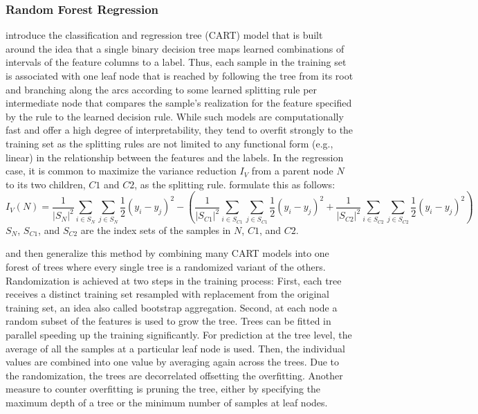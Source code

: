 \subsubsection{Random Forest Regression}
\label{rf}

\cite{breiman1984} introduce the classification and regression tree
    (CART) model that is built around the idea that a single binary
    decision tree maps learned combinations of intervals of the feature
    columns to a label.
Thus, each sample in the training set is associated with one leaf node that
    is reached by following the tree from its root and branching along the
    arcs according to some learned splitting rule per intermediate node that
    compares the sample's realization for the feature specified by the rule to
    the learned decision rule.
While such models are computationally fast and offer a high degree of
    interpretability, they tend to overfit strongly to the training set as
    the splitting rules are not limited to any functional form (e.g., linear)
    in the relationship between the features and the labels.
In the regression case, it is common to maximize the variance reduction $I_V$
    from a parent node $N$ to its two children, $C1$ and $C2$, as the
    splitting rule.
\cite{breiman1984} formulate this as follows:
$$
I_V(N)
=
\frac{1}{|S_N|^2} \sum_{i \in S_N} \sum_{j \in S_N}
    \frac{1}{2} (y_i - y_j)^2
- \left(
    \frac{1}{|S_{C1}|^2} \sum_{i \in S_{C1}} \sum_{j \in S_{C1}}
        \frac{1}{2} (y_i - y_j)^2
    +
    \frac{1}{|S_{C2}|^2} \sum_{i \in S_{C2}} \sum_{j \in S_{C2}}
        \frac{1}{2} (y_i - y_j)^2
\right)
$$
$S_N$, $S_{C1}$, and $S_{C2}$ are the index sets of the samples in $N$, $C1$,
    and $C2$. 

\cite{ho1998} and then \cite{breiman2001} generalize this method by combining
    many CART models into one forest of trees where every single tree is
    a randomized variant of the others.
Randomization is achieved at two steps in the training process:
First, each tree receives a distinct training set resampled with replacement
    from the original training set, an idea also called bootstrap
    aggregation.
Second, at each node a random subset of the features is used to grow the tree.
Trees can be fitted in parallel speeding up the training significantly.
For prediction at the tree level, the average of all the samples at a
    particular leaf node is used.
Then, the individual values are combined into one value by averaging again
    across the trees.
Due to the randomization, the trees are decorrelated offsetting the
    overfitting.
Another measure to counter overfitting is pruning the tree, either by
    specifying the maximum depth of a tree or the minimum number of samples
    at leaf nodes.

